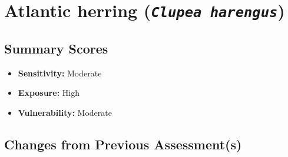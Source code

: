 \documentclass[
  letterpaper,
  DIV=11,
  numbers=noendperiod]{scrartcl}
\author{}
\date{}
\providecommand{\tightlist}{%
  \setlength{\itemsep}{0pt}\setlength{\parskip}{0pt}}\usepackage{longtable,booktabs,array}
\begin{document}
\section{\texorpdfstring{Atlantic herring
(\emph{\texttt{Clupea\ harengus}})}{Atlantic herring (Clupea harengus)}}\label{atlantic-herring-clupea-harengus}

\subsection{Summary Scores}\label{summary-scores}

\begin{itemize}
\tightlist
\item
  \textbf{Sensitivity:} Moderate
\item
  \textbf{Exposure:} High
\item
  \textbf{Vulnerability:} Moderate
\end{itemize}

\subsection{Changes from Previous
Assessment(s)}\label{changes-from-previous-assessments}
\end{document}
